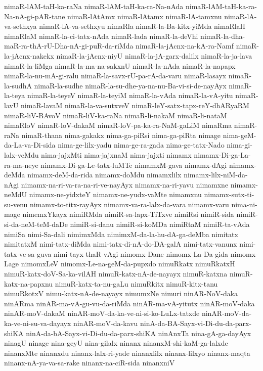 {nimaR-lAM-taH-ka-raNa
nimaR-lAM-taH-ka-ra-Na-nAda
nimaR-lAM-taH-ka-ra-Na-nA-gi-pAR-tane
nimaR-lAtAmx
nimaR-lAtamx
nimaR-lA-tamxnu
nimaR-lA-va-sethxya
nimaR-lA-va-sethxyu
nimaRla
nimaR-la-Ba-kitx-yiMda
nimaRlaH
nimaRlaM
nimaR-la-ci-tatx-nAda
nimaR-lada
nimaR-la-deVhi
nimaR-la-dha-maR-ra-thA-rU-Dha-nA-gi-puR-da-riMda
nimaR-la-jAcnx-na-kA-ra-Namf
nimaR-la-jAcnx-nakekx
nimaR-la-jAcnx-niyU
nimaR-la-jA-garx-dalilx
nimaR-la-ja-lava
nimaR-la-liMga
nimaR-la-ma-na-sakxnU
nimaR-la-nAda
nimaR-la-napapx
nimaR-la-nu-mA-gi-ralu
nimaR-la-savx-rU-pa-rA-da-varu
nimaR-lasayx
nimaR-la-sudhA
nimaR-la-sudhe
nimaR-la-su-dhe-ya-na-nu-Ba-vi-si-de-nayAyx
nimaR-la-teya
nimaR-la-teyeV
nimaR-la-teyiM
nimaR-la-vAda
nimaR-la-vA-yitu
nimaR-lavU
nimaR-lavaM
nimaR-la-va-sutxveV
nimaR-leY-satx-tapx-reY-dhARyaRM
nimaR-liV-BAvoV
nimaR-liV-ka-raNa
nimaR-li-nakaM
nimaR-li-nataM
nimaRloV
nimaR-loV-dakaM
nimaR-loV-pa-ka-ra-NaM-gaLiM
nimaRma
nimaR-raNa
nimaR-thana
nima-gakakx
nima-ga-piRsi
nima-ga-piRta
nimage
nima-geM-da-La-va-Di-sida
nima-ge-lilx-yadu
nima-ge-ra-gada
nima-ge-tatx-Nado
nima-gi-lalx-veMdu
nima-jajxMti
nima-jajxnaM
nima-jajxti
nimamx
nimamx-Di-ga-La-ra-ma-neye
nimamx-Di-ga-Le-tatx-luMTe
nimamxM-gava
nimamx-dAgi
nimamx-deMda
nimamx-deM-da-rida
nimamx-doMdu
nimamxlilx
nimamx-lilx-niM-da-nAgi
nimamx-na-ri-va-ra-na-ri-ve-nayAyx
nimamx-na-ri-yavu
nimamxne
nimamx-neMdU
nimamx-ne-yidxteY
nimamx-ne-yudx-vaMte
nimamxnu
nimamx-sutx-ti-su-venu
nimamx-to-titx-rayAyx
nimamx-va-ra-lalx-da-vara
nimamx-varu
nima-ni-mage
nimemxYkayx
nimiRMda
nimiR-sa-lapx-TiTxve
nimiRsi
nimiR-sida
nimiR-si-da-neM-teM-daDe
nimiR-si-danu
nimiR-si-koMDa
nimiRtaM
nimiR-ta-vAda
nimiSa
nimi-Sa-dali
nimimxMda
nimimxM-da-la-hu-dA-ga-deMba
nimitatx
nimitatxM
nimi-tatx-diMda
nimi-tatx-di-nA-do-DA-galA
nimi-tatx-vanunx
nimi-tatx-ve-sa-guva
nimi-tayx-thaR-vAgi
nimomx-Dane
nimomx-La-Da-gida
nimomx-Lage
nimomxLeV
nimomx-Le-na-geM-da-pupxdo
nimuRkatx
nimuRkatxH
nimuR-katx-doV-Sa-ka-vilAH
nimuR-katx-nA-de-nayayx
nimuR-katxna
nimuR-katx-na-papxnu
nimuR-katx-ta-nu-gaLu
nimuRkitx
nimuR-kitx-tanu
nimuRkotxV
nimu-katx-nA-de-nayayx
nimumxNe
nimuri
ninAR-NoV-daka
ninARma
ninAR-ma-vA-gu-vu-da-riMda
ninAR-ma-vA-yitutx
ninAR-moV-daka
ninAR-moV-dakaM
ninAR-moV-da-ka-ve-ni-si-ko-LuLx-tatxde
ninAR-moV-da-ka-ve-ni-su-va-dayayx
ninAR-moV-da-kavu
ninA-da-BA-Sayx-vi-Di-du-da-parx-shiKA
ninA-da-bA-Sayx-vi-Di-du-da-parx-shiKA
ninAnxTa
nina-gA-ga-dayAyx
ninagU
ninage
nina-geyU
nina-gilalx
ninanx
ninanxM-shi-kaM-ga-lalxde
ninanxMte
ninanxdu
ninanx-lalx-ri-yade
ninanxlilx
ninanx-lilxyo
ninanx-maqta
ninanx-nA-ya-va-sa-rake
ninanx-na-ciR-sida
ninanxniV
}
